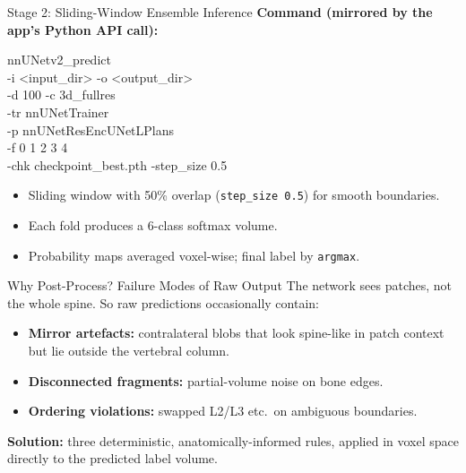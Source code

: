 \documentclass[aspectratio=169,11pt]{beamer}
\begin{document}
\begin{frame}{Stage 2: Sliding-Window Ensemble Inference}
  \textbf{Command (mirrored by the app's Python API call):}
  \vspace{0.4em}

  {\footnotesize\ttfamily
  \noindent
  nnUNetv2\_predict\\
  \hspace*{1em}-i <input\_dir> -o <output\_dir>\\
  \hspace*{1em}-d 100 -c 3d\_fullres\\
  \hspace*{1em}-tr nnUNetTrainer\\
  \hspace*{1em}-p nnUNetResEncUNetLPlans\\
  \hspace*{1em}-f 0 1 2 3 4\\
  \hspace*{1em}-chk checkpoint\_best.pth -step\_size 0.5
  }
  \vspace{0.6em}
  \begin{itemize}
    \item Sliding window with 50\% overlap (\texttt{step\_size 0.5}) for smooth boundaries.
    \item Each fold produces a 6-class softmax volume.
    \item Probability maps averaged voxel-wise; final label by \texttt{argmax}.
  \end{itemize}
\end{frame}

\begin{frame}{Why Post-Process? Failure Modes of Raw Output}
  The network sees patches, not the whole spine. So raw predictions
  occasionally contain:
  \vspace{0.4em}
  \begin{itemize}
    \item \textbf{Mirror artefacts:} contralateral blobs that look spine-like
          in patch context but lie outside the vertebral column.
    \item \textbf{Disconnected fragments:} partial-volume noise on bone edges.
    \item \textbf{Ordering violations:} swapped L2/L3 etc.\ on ambiguous boundaries.
  \end{itemize}
  \vspace{0.6em}
  \textbf{Solution:} three deterministic, anatomically-informed rules,
  applied in voxel space directly to the predicted label volume.
\end{frame}
\end{document}
